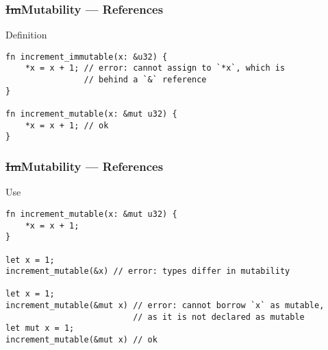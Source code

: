 \documentclass[t]{beamer}
\begin{document}
\begin{frame}[c,fragile]
\frametitle{\st{Im}Mutability --- References}

\begin{block}{Definition}
\small
\begin{verbatim}
fn increment_immutable(x: &u32) {
    *x = x + 1; // error: cannot assign to `*x`, which is
                // behind a `&` reference
}

fn increment_mutable(x: &mut u32) {
    *x = x + 1; // ok
}
\end{verbatim}
\end{block}

\end{frame}


\begin{frame}[c,fragile]
\frametitle{\st{Im}Mutability --- References}

\begin{block}{Use}
\small
\begin{verbatim}
fn increment_mutable(x: &mut u32) {
    *x = x + 1;
}

let x = 1;
increment_mutable(&x) // error: types differ in mutability

let x = 1;
increment_mutable(&mut x) // error: cannot borrow `x` as mutable,
                          // as it is not declared as mutable
let mut x = 1;
increment_mutable(&mut x) // ok
\end{verbatim}
\end{block}

\end{frame}
\end{document}
